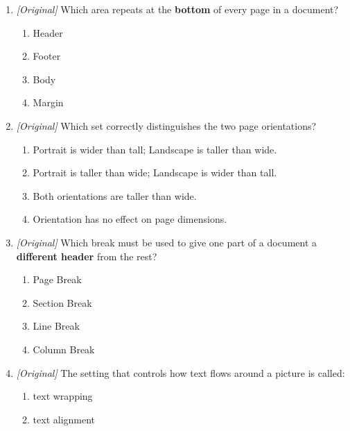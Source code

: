 \begin{enumerate}[label=\textbf{Q\arabic*.}, leftmargin=*]
\begin{enumerate}[label=\Roman*.]
    \item A Page Break allows different headers and footers in different
      parts of a document.
  \end{enumerate}
  \begin{enumerate}[label=\Alph*.]
    \item I only
    \item I and II only
    \item II and III only
    \item I, II, and III
  \end{enumerate}
\item \textit{[Original]} Which area repeats at the \textbf{bottom} of every
  page in a document?
  \begin{enumerate}[label=\Alph*.]
    \item Header
    \item Footer
    \item Body
    \item Margin
  \end{enumerate}
\item \textit{[Original]} Which set correctly distinguishes the two page
  orientations?
  \begin{enumerate}[label=\Alph*.]
    \item Portrait is wider than tall; Landscape is taller than wide.
    \item Portrait is taller than wide; Landscape is wider than tall.
    \item Both orientations are taller than wide.
    \item Orientation has no effect on page dimensions.
  \end{enumerate}
\item \textit{[Original]} Which break must be used to give one part of a
  document a \textbf{different header} from the rest?
  \begin{enumerate}[label=\Alph*.]
    \item Page Break
    \item Section Break
    \item Line Break
    \item Column Break
  \end{enumerate}
\item \textit{[Original]} The setting that controls how text flows around a
  picture is called:
  \begin{enumerate}[label=\Alph*.]
    \item text wrapping
    \item text alignment

\end{enumerate}
\end{enumerate}
